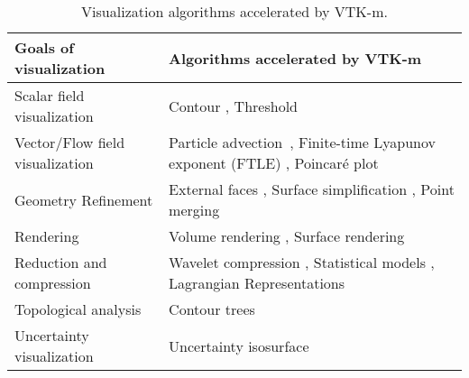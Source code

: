\begin{table*}[htbp]
\caption{
Visualization algorithms accelerated by VTK-m.
}
\label{tab:algorithms}
\begin{tabularx}{\textwidth}{lX}
\toprule
    Goals of visualization & Algorithms accelerated by VTK-m\\
    \midrule
    Scalar field visualization & Contour \cite{Lo2012}, Threshold \cite{Maynard2013}  \\
    Vector/Flow field visualization & Particle advection~\cite{Pugmire2018}, Finite-time Lyapunov exponent (FTLE) \cite{Sane2021:EGPGV}, Poincar\'{e} plot~\cite{suchyta2022hybrid}  \\
    Geometry Refinement & External faces \cite{Lessley2016,Lessley2017}, Surface simplification \cite{Moreland2016}, Point merging \cite{Yenpure2019} \\
    Rendering & Volume rendering \cite{Larsen2015:VR}, Surface rendering \cite{Larsen2015:RayTrace}  \\
    Reduction and compression &
    Wavelet compression \cite{Li2017}, Statistical models \cite{Wang2019},  Lagrangian Representations \cite{Sane2021:ICCS,Sane2021:EGPGV}  \\
    Topological analysis & Contour trees \cite{Carr2021}  \\
    Uncertainty visualization & Uncertainty isosurface \cite{Wang2023}  \\
\bottomrule
\end{tabularx}
\end{table*}

